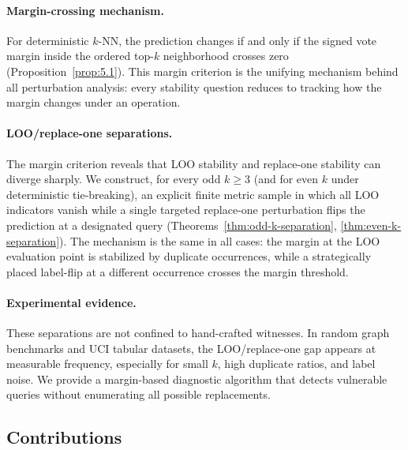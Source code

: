 \paragraph{Margin-crossing mechanism.}
For deterministic $k$-NN, the prediction changes if and only if the signed
vote margin inside the ordered top-$k$ neighborhood crosses zero
(Proposition~\ref{prop:5.1}). This margin criterion is the unifying mechanism
behind all perturbation analysis: every stability question reduces to tracking
how the margin changes under an operation.

\paragraph{LOO/replace-one separations.}
The margin criterion reveals that LOO stability and replace-one stability can
diverge sharply. We construct, for every odd $k \ge 3$ (and for even $k$
under deterministic tie-breaking), an explicit finite metric sample in which
all LOO indicators vanish while a single targeted replace-one perturbation
flips the prediction at a designated query (Theorems~\ref{thm:odd-k-separation},
\ref{thm:even-k-separation}). The mechanism is the same in all cases: the
margin at the LOO evaluation point is stabilized by duplicate occurrences,
while a strategically placed label-flip at a different occurrence crosses the
margin threshold.

\paragraph{Experimental evidence.}
These separations are not confined to hand-crafted witnesses. In random graph
benchmarks and UCI tabular datasets, the LOO/replace-one gap appears at
measurable frequency, especially for small $k$, high duplicate ratios, and
label noise. We provide a margin-based diagnostic algorithm that detects
vulnerable queries without enumerating all possible replacements.

\subsection*{Contributions}

